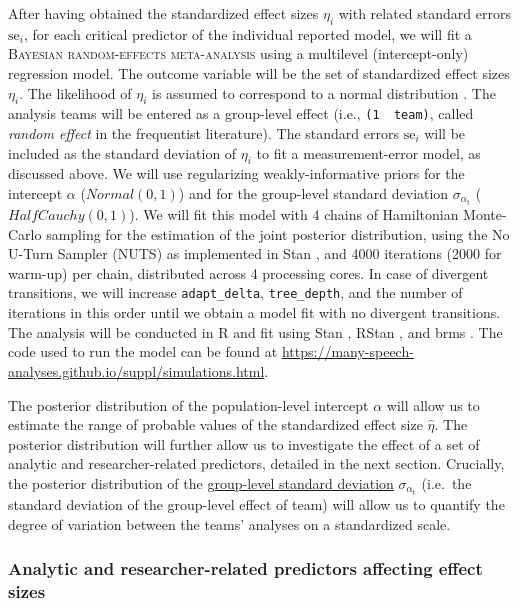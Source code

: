 \documentclass[Review,times,sageh]{sagej}
\begin{document}
After having obtained the standardized effect sizes \(\eta_i\) with related standard errors \(\text{se}_i\), for each critical predictor of the individual reported model, we will fit a \textsc{Bayesian random-effects meta-analysis} using a multilevel (intercept-only) regression model.
The outcome variable will be the set of standardized effect sizes \(\eta_i\).
The likelihood of \(\eta_i\) is assumed to correspond to a normal distribution \citep{knight2000}.
The analysis teams will be entered as a group-level effect (i.e., \texttt{(1\ \textbar{}\ team)}, called \emph{random effect} in the frequentist literature).
The standard errors \(\text{se}_i\) will be included as the standard deviation of \(\eta_i\) to fit a measurement-error model, as discussed above.
We will use regularizing weakly-informative priors for the intercept \(\alpha\) (\(Normal(0, 1)\)) and for the group-level standard deviation \(\sigma_{\alpha_{\text{t}}}\) (\(HalfCauchy(0, 1)\)).
We will fit this model with 4 chains of Hamiltonian Monte-Carlo sampling for the estimation of the joint posterior distribution, using the No U-Turn Sampler (NUTS) as implemented in Stan \citep{stan2021}, and 4000 iterations (2000 for warm-up) per chain, distributed across 4 processing cores.
In case of divergent transitions, we will increase \texttt{adapt\_delta}, \texttt{tree\_depth}, and the number of iterations in this order until we obtain a model fit with no divergent transitions.
The analysis will be conducted in R \citep{R-base} and fit using Stan \citep{stan2021}, RStan \citep{stan2020a}, and brms \citep{burkner2017}.
The code used to run the model can be found at \url{https://many-speech-analyses.github.io/suppl/simulations.html}.

The posterior distribution of the population-level intercept \(\alpha\) will allow us to estimate the range of probable values of the standardized effect size \(\hat{\eta}\).
The posterior distribution will further allow us to investigate the effect of a set of analytic and researcher-related predictors, detailed in the next section.
Crucially, the posterior distribution of the \href{.smallcaps}{group-level standard deviation} \(\sigma_{\alpha_{\text{t}}}\) (i.e.~the standard deviation of the group-level effect of team) will allow us to quantify the degree of variation between the teams' analyses on a standardized scale.

\hypertarget{anares-preds}{%
\subsubsection{Analytic and researcher-related predictors affecting effect sizes}\label{anares-preds}}
\end{document}
